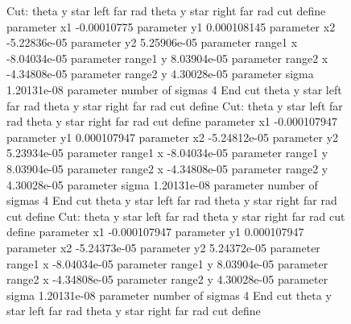 \documentclass{article}
\begin{document}
\begin{landscape}
\begin{figure}[H]
	\flushleft
\end{figure}
\begin{figure}[H]
	\flushleft
\end{figure}
\begin{figure}[H]
	\flushleft
\end{figure}
\begin{figure}[H]
	\flushleft
\end{figure}
\begin{figure}[H]
	\flushleft
\end{figure}
\begin{figure}[H]
	\flushleft
\end{figure}
\begin{figure}[H]
	\flushleft
\end{figure}
\begin{figure}[H]
	\flushleft
\end{figure}
\begin{figure}[H]
	\flushleft
Cut: theta y star left far rad theta y star right far rad cut define 
parameter 	x1 -0.00010775
parameter 	y1 0.000108145
parameter 	x2 -5.22836e-05
parameter 	y2 5.25906e-05
parameter range1 x -8.04034e-05
parameter range1 y 8.03904e-05
parameter range2 x -4.34808e-05
parameter range2 y 4.30028e-05
parameter sigma 1.20131e-08
parameter number of sigmas 4
End cut theta y star left far rad theta y star right far rad cut define\newline 
Cut: theta y star left far rad theta y star right far rad cut define 
parameter 	x1 -0.000107947
parameter 	y1 0.000107947
parameter 	x2 -5.24812e-05
parameter 	y2 5.23934e-05
parameter range1 x -8.04034e-05
parameter range1 y 8.03904e-05
parameter range2 x -4.34808e-05
parameter range2 y 4.30028e-05
parameter sigma 1.20131e-08
parameter number of sigmas 4
End cut theta y star left far rad theta y star right far rad cut define\newline 
Cut: theta y star left far rad theta y star right far rad cut define 
parameter 	x1 -0.000107947
parameter 	y1 0.000107947
parameter 	x2 -5.24373e-05
parameter 	y2 5.24372e-05
parameter range1 x -8.04034e-05
parameter range1 y 8.03904e-05
parameter range2 x -4.34808e-05
parameter range2 y 4.30028e-05
parameter sigma 1.20131e-08
parameter number of sigmas 4
End cut theta y star left far rad theta y star right far rad cut define\newline 
\end{figure}
\begin{figure}[H]

\end{figure}
\end{landscape}
\end{document}
